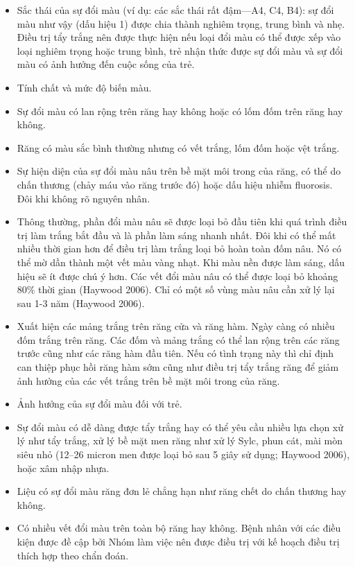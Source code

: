 \begin{itemize}
\setlength{\itemsep}{0pt}
    \item Sắc thái của sự đổi màu (ví dụ: các sắc thái rất đậm—A4, C4, B4): sự đổi màu như vậy (dấu hiệu 1) được chia thành nghiêm trọng, trung bình và nhẹ. Điều trị tẩy trắng nên được thực hiện nếu loại đổi màu có thể được xếp vào loại nghiêm trọng hoặc trung bình, trẻ nhận thức được sự đổi màu và sự đổi màu có ảnh hưởng đến cuộc sống của trẻ.
    \item Tính chất và mức độ biến màu.
    \item Sự đổi màu có lan rộng trên răng hay không hoặc có lốm đốm trên răng hay không.
    \item Răng có màu sắc bình thường nhưng có vết trắng, lốm đốm hoặc vệt trắng.
    \item Sự hiện diện của sự đổi màu nâu trên bề mặt môi trong của răng, có thể do chấn thương (chảy máu vào răng trước đó) hoặc dấu hiệu nhiễm fluorosis. Đôi khi không rõ nguyên nhân. \item Thông thường, phần đổi màu nâu sẽ được loại bỏ đầu tiên khi quá trình điều trị làm trắng bắt đầu và là phần làm sáng nhanh nhất. Đôi khi có thể mất nhiều thời gian hơn để điều trị làm trắng loại bỏ hoàn toàn đốm nâu. Nó có thể mờ dần thành một vết màu vàng nhạt. Khi màu nền được làm sáng, dấu hiệu sẽ ít được chú ý hơn. Các vết đổi màu nâu có thể được loại bỏ khoảng 80\% thời gian (Haywood 2006). Chỉ có một số vùng màu nâu cần xử lý lại sau 1-3 năm (Haywood 2006).
    \item Xuất hiện các mảng trắng trên răng cửa và răng hàm. Ngày càng có nhiều đốm trắng trên răng. Các đốm và mảng trắng có thể lan rộng trên các răng trước cũng như các răng hàm đầu tiên. Nếu có tình trạng này thì chỉ định can thiệp phục hồi răng hàm sớm cũng như điều trị tẩy trắng răng để giảm ảnh hưởng của các vết trắng trên bề mặt môi trong của răng.
    \item Ảnh hưởng của sự đổi màu đối với trẻ.
    \item Sự đổi màu có dễ dàng được tẩy trắng hay có thể yêu cầu nhiều lựa chọn xử lý như tẩy trắng, xử lý bề mặt men răng như xử lý Sylc, phun cát, mài mòn siêu nhỏ (12–26 micron men được loại bỏ sau 5 giây sử dụng; Haywood 2006), hoặc xâm nhập nhựa.
    \item Liệu có sự đổi màu răng đơn lẻ chẳng hạn như răng chết do chấn thương hay không.
    \item Có nhiều vết đổi màu trên toàn bộ răng hay không. Bệnh nhân với các điều kiện được đề cập bởi Nhóm làm việc nên được điều trị với kế hoạch điều trị thích hợp theo chẩn đoán.
\end{itemize}

